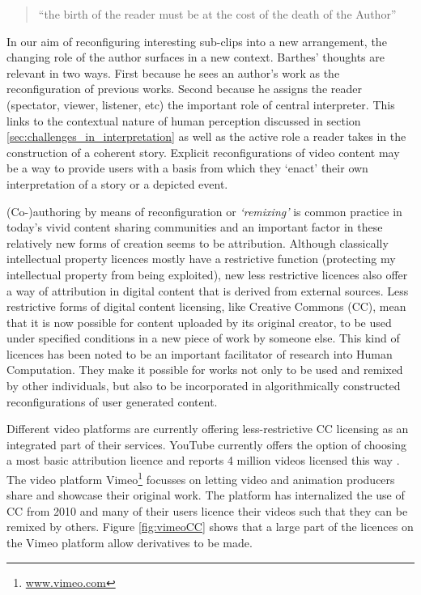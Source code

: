 \begin{quote}
  ``the birth of the reader must be at the cost of the death of the Author''
\end{quote}

In our aim of reconfiguring interesting sub-clips into a new arrangement, the changing role of the author surfaces in a new context. Barthes' thoughts are relevant in two ways. First because he sees an author's work as the reconfiguration of previous works. Second because he assigns the reader (spectator, viewer, listener, etc) the important role of central interpreter. This links to the contextual nature of human perception discussed in section \ref{sec:challenges_in_interpretation} as well as the active role a reader takes in the construction of a coherent story. Explicit reconfigurations of video content may be a way to provide users with a basis from which they `enact' their own interpretation of a story or a depicted event.

(Co-)authoring by means of reconfiguration or \emph{`remixing'} is common practice in today's vivid content sharing communities \cite{Diakopoulos:2007jn} and an important factor in these relatively new forms of creation seems to be attribution\cite{Luther:2010wq}. Although classically intellectual property licences mostly have a restrictive function (protecting my intellectual property from being exploited), new less restrictive licences also offer a way of attribution in digital content that is derived from external sources. Less restrictive forms of digital content licensing, like Creative Commons (CC), mean that it is now possible for content uploaded by its original creator, to be used under specified conditions in a new piece of work by someone else. This kind of licences has been noted to be an important facilitator of research into Human Computation\cite{Law:2009vl}. They make it possible for works not only to be used and remixed by other individuals, but also to be incorporated in algorithmically constructed reconfigurations of user generated content.

Different video platforms are currently offering less-restrictive CC licensing as an integrated part of their services. YouTube currently offers the option of choosing a most basic attribution licence and reports 4 million videos licensed this way \cite{YouTubeCC}. The video platform Vimeo\footnote{\url{www.vimeo.com}} focusses on letting video and animation producers share and showcase their original work. The platform has internalized the use of CC from 2010\cite{vimeoTimeline} and many of their users licence their videos such that they can be remixed by others. Figure \ref{fig:vimeoCC} shows that a large part of the licences on the Vimeo platform allow derivatives to be made\cite{vimeoCC}.

